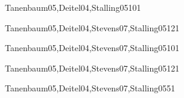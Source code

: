 \begin{syllabus}
        \begin{unit}{\PBDWebPlatforms}{}{Tanenbaum05,Deitel04,Stalling05}{10}{1}
                \PBDWebPlatformsAllTopics
                \PBDWebPlatformsAllLearningOutcomes
        \end{unit}
        
        \begin{unit}{\NCNetworkedApplications}{}{Tanenbaum05,Deitel04,Stevens07,Stalling05}{12}{1}
                \NCNetworkedApplicationsAllTopics
                \NCNetworkedApplicationsAllLearningOutcomes
        \end{unit}
        
        \begin{unit}{\NCResourceAllocation}{}{Tanenbaum05,Deitel04,Stevens07,Stalling05}{10}{1}
                \NCResourceAllocationAllTopics
                \NCResourceAllocationAllLearningOutcomes
        \end{unit}
        
        \begin{unit}{\IMMultimediaSystems}{}{Tanenbaum05,Deitel04,Stevens07,Stalling05}{12}{1}
                \IMMultimediaSystemsAllTopics
                \IMMultimediaSystemsAllLearningOutcomes
        \end{unit}
        
        \begin{unit}{\NCMobility}{}{Tanenbaum05,Deitel04,Stevens07,Stalling05}{5}{1}
                \NCMobilityAllTopics
                \NCMobilityAllLearningOutcomes
        \end{unit}
        
        \begin{coursebibliography}
        \end{coursebibliography}
        
        \end{syllabus}
        
        